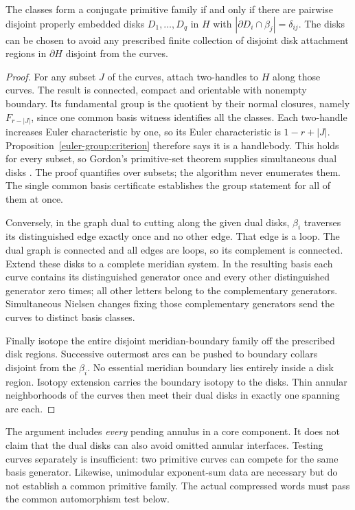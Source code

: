 \begin{proposition}
\label{signed-annuli:bridge}
The classes form a conjugate primitive family if and only if there are
pairwise disjoint properly embedded disks $D_1,\ldots,D_q$ in $H$ with
$|\partial D_i\cap\beta_j|=\delta_{ij}$.  The disks can be chosen to avoid
any prescribed finite collection of disjoint disk attachment regions in
$\partial H$ disjoint from the curves.
\end{proposition}
\begin{proof}
For any subset $J$ of the curves, attach two-handles to $H$ along those
curves.  The result is connected, compact and orientable with nonempty
boundary.  Its fundamental group is the quotient by their normal
closures, namely $F_{r-|J|}$, since one common basis witness identifies
all the classes.  Each two-handle increases Euler characteristic by one,
so its Euler characteristic is $1-r+|J|$.  Proposition~\ref{euler-group:criterion}
therefore says it is a handlebody.  This holds for every subset, so
Gordon's primitive-set theorem supplies simultaneous dual disks
\cite{signed-gordon}.  The proof quantifies over subsets; the algorithm
never enumerates them.  The single common basis certificate establishes
the group statement for all of them at once.

Conversely, in the graph dual to cutting along the given dual disks,
$\beta_i$ traverses its distinguished edge exactly once and no other
edge.  That edge is a loop.  The dual graph is connected and all edges
are loops, so its complement is connected.  Extend these disks to a
complete meridian system.  In the resulting basis each curve contains
its distinguished generator once and every other distinguished generator
zero times; all other letters belong to the complementary generators.
Simultaneous Nielsen changes fixing those complementary generators send
the curves to distinct basis classes.

Finally isotope the entire disjoint meridian-boundary family off the
prescribed disk regions.  Successive outermost arcs can be pushed to
boundary collars disjoint from the $\beta_i$.  No essential meridian
boundary lies entirely inside a disk region.  Isotopy extension carries
the boundary isotopy to the disks.  Thin annular neighborhoods of the
curves then meet their dual disks in exactly one spanning arc each.
\end{proof}

The argument includes \emph{every} pending annulus in a core component.
It does not claim that the dual disks can also avoid omitted annular
interfaces.  Testing curves separately is insufficient: two primitive
curves can compete for the same basis generator.  Likewise, unimodular
exponent-sum data are necessary but do not establish a common primitive
family.  The actual compressed words must pass the common automorphism
test below.

